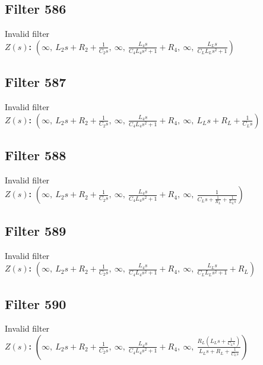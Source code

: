 \documentclass{article}
\begin{document}
\subsection*{Filter 586}
Invalid filter \\ 
\textbf{$Z(s)$:} $\left( \infty, \  L_{2} s + R_{2} + \frac{1}{C_{2} s}, \  \infty, \  \frac{L_{4} s}{C_{4} L_{4} s^{2} + 1} + R_{4}, \  \infty, \  \frac{L_{L} s}{C_{L} L_{L} s^{2} + 1}\right)$ \\ 
\subsection*{Filter 587}
Invalid filter \\ 
\textbf{$Z(s)$:} $\left( \infty, \  L_{2} s + R_{2} + \frac{1}{C_{2} s}, \  \infty, \  \frac{L_{4} s}{C_{4} L_{4} s^{2} + 1} + R_{4}, \  \infty, \  L_{L} s + R_{L} + \frac{1}{C_{L} s}\right)$ \\ 
\subsection*{Filter 588}
Invalid filter \\ 
\textbf{$Z(s)$:} $\left( \infty, \  L_{2} s + R_{2} + \frac{1}{C_{2} s}, \  \infty, \  \frac{L_{4} s}{C_{4} L_{4} s^{2} + 1} + R_{4}, \  \infty, \  \frac{1}{C_{L} s + \frac{1}{R_{L}} + \frac{1}{L_{L} s}}\right)$ \\ 
\subsection*{Filter 589}
Invalid filter \\ 
\textbf{$Z(s)$:} $\left( \infty, \  L_{2} s + R_{2} + \frac{1}{C_{2} s}, \  \infty, \  \frac{L_{4} s}{C_{4} L_{4} s^{2} + 1} + R_{4}, \  \infty, \  \frac{L_{L} s}{C_{L} L_{L} s^{2} + 1} + R_{L}\right)$ \\ 
\subsection*{Filter 590}
Invalid filter \\ 
\textbf{$Z(s)$:} $\left( \infty, \  L_{2} s + R_{2} + \frac{1}{C_{2} s}, \  \infty, \  \frac{L_{4} s}{C_{4} L_{4} s^{2} + 1} + R_{4}, \  \infty, \  \frac{R_{L} \left(L_{L} s + \frac{1}{C_{L} s}\right)}{L_{L} s + R_{L} + \frac{1}{C_{L} s}}\right)$ \\ 
\end{document}
